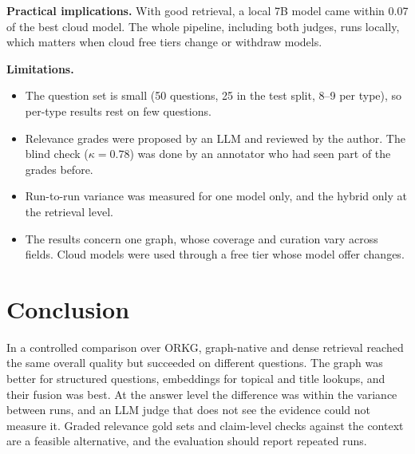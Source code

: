 \textbf{Practical implications.} With good retrieval, a local 7B model came
within 0.07 of the best cloud model. The whole pipeline, including both
judges, runs locally, which matters when cloud free tiers change or withdraw
models.

\textbf{Limitations.}
\begin{itemize}
\item The question set is small (50 questions, 25 in the test split, 8--9 per
  type), so per-type results rest on few questions.
\item Relevance grades were proposed by an LLM and reviewed by the author. The
  blind check ($\kappa = 0.78$) was done by an annotator who had seen part of
  the grades before.
\item Run-to-run variance was measured for one model only, and the hybrid only
  at the retrieval level.
\item The results concern one graph, whose coverage and curation vary across
  fields. Cloud models were used through a free tier whose model offer changes.
\end{itemize}

\section{Conclusion}
\label{sec:conclusion}

In a controlled comparison over ORKG, graph-native and dense retrieval reached
the same overall quality but succeeded on different questions. The graph was
better for structured questions, embeddings for topical and title lookups, and
their fusion was best. At the answer level the difference was within the
variance between runs, and an LLM judge that does not see the evidence could
not measure it. Graded relevance gold sets and claim-level checks against the
context are a feasible alternative, and the evaluation should report repeated
runs.
